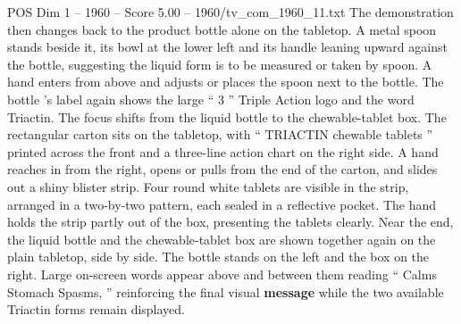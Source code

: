 \begin{textsample}{POS Dim 1 – 1960 – Score 5.00 – 1960/tv\_com\_1960\_11.txt}
The demonstration then changes back to the product bottle alone on the tabletop.
A metal spoon stands beside it, its bowl at the lower left and its handle leaning upward against the bottle, suggesting the liquid form is to be measured or taken by spoon.
A hand enters from above and adjusts or places the spoon next to the bottle.
The bottle ’s label again shows the large “ 3 ” Triple Action logo and the word Triactin.
The focus shifts from the liquid bottle to the chewable-tablet box.
The rectangular carton sits on the tabletop, with “ TRIACTIN chewable tablets ” printed across the front and a three-line action chart on the right side.
A hand reaches in from the right, opens or pulls from the end of the carton, and slides out a shiny blister strip.
Four round white tablets are visible in the strip, arranged in a two-by-two pattern, each sealed in a reflective pocket.
The hand holds the strip partly out of the box, presenting the tablets clearly.
Near the end, the liquid bottle and the chewable-tablet box are shown together again on the plain tabletop, side by side.
The bottle stands on the left and the box on the right.
Large on-screen words appear above and between them reading “ Calms Stomach Spasms, ” reinforcing the final visual \textbf{message} while the two available Triactin forms remain displayed.

\end{textsample}
